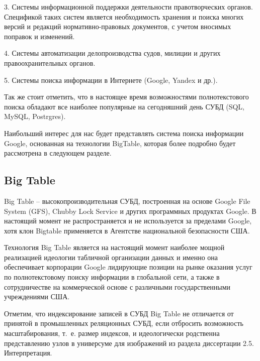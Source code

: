 3. Системы информационной поддержки деятельности правотворческих органов. Спецификой таких систем является необходимость хранения и поиска многих версий и редакций нормативно-правовых документов, с учетом вносимых поправок и изменений. 

4. Системы автоматизации делопроизводства судов, милиции и других правоохранительных органов.

5. Системы поиска информации в Интернете (Google, Yandex и др.).

Так же стоит отметить, что в настоящее время возможностями полнотекстового поиска обладают все наиболее популярные на сегодняшний день СУБД (SQL, MySQL, Postrgres).

Наибольший интерес для нас будет представлять система поиска информации Google, основанная на технологии BigTable, которая более подробно будет рассмотрена  в следующем разделе. 
\subsection{Big Table}
Big Table -- высокопроизводительная СУБД, построенная на основе Google File System (GFS), Chubby Lock Service и  других программных продуктах Google. В настоящий момент не распространяется и не используется за пределами Google, хотя клон Bigtable применяется в Агентстве национальной безопасности США.

Технология  Big Table  является на настоящий момент наиболее мощной реализацией идеологии табличной организации данных и именно она обеспечивает корпорации Google лидирующие позиции на рынке оказания услуг по полнотекстовому поиску информации в глобальной сети, а также в сотрудничестве на коммерческой основе с различными государственными учреждениями США.

Отметим, что индексирование записей в  СУБД  Big Table  не отличается от принятой в промышленных реляционных СУБД, если отбросить возможность масштабирования, т.~е. размер индексов, и идеологически родственна представлению узлов в универсуме для изображений из раздела диссертации 2.5. Интерпретация. 

%



